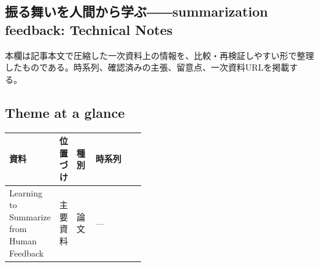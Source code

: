 \subsection*{振る舞いを人間から学ぶ――summarization feedback: Technical Notes}
本欄は記事本文で圧縮した一次資料上の情報を、比較・再検証しやすい形で整理したものである。時系列、確認済みの主張、留意点、一次資料URLを掲載する。
\medskip
\subsection*{Theme at a glance}
\begin{center}
\footnotesize
\begin{tabularx}{\linewidth}{@{}p{0.20\linewidth}p{0.10\linewidth}p{0.14\linewidth}X@{}}
\toprule
資料 & 位置づけ & 種別 & 時系列 \\
\midrule
Learning to Summarize from Human Feedback & 主要資料 & 論文 & — \\
\bottomrule
\end{tabularx}
\end{center}
\normalsize

